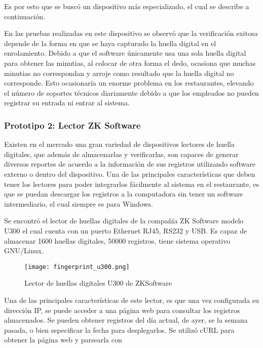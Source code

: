 Es por esto que se buscó un dispositivo más especializado, el cual se describe a continuación.

En las pruebas realizadas en este dispositivo se observó que la verificación exitosa depende de la forma en que se haya capturado la huella digital en el enrolamiento. Debido a que el software únicamente usa una sola huella digital para obtener las minutias, al colocar de otra forma el dedo, ocasiona que muchas minutias no correspondan y arroje como resultado que la huella digital no corresponde. Esto ocasionaría un enorme problema en los restaurantes, elevando el número de soportes técnicos diariamente debido a que los empleados no pueden registrar su entrada ni entrar al sistema.

\subsubsection{Prototipo 2: Lector ZK Software}
\label{sec:lector_zksoftware}

Existen en el mercado una gran variedad de dispositivos lectores de huella digitales, que además de almacenarlas y verificarlas, son capaces de generar diversos reportes de acuerdo a la información de sus registros utilizando software externo o dentro del dispositivo. Una de las principales características que deben tener los lectores para poder integrarlos fácilmente al sistema en el restaurante, es que se puedan descargar los registros a la computadora sin tener un software intermediario, el cual siempre es para Windows. 

Se encontró el lector de huellas digitales de la compañía ZK Software modelo U300 el cual cuenta con un puerto Ethernet RJ45, RS232 y USB. Es capaz de almacenar 1600 huellas digitales, 50000 registros, tiene sistema operativo GNU/Linux.

\begin{figure}[htb]
 \begin{center}
  \texttt{[image: fingerprint\_u300.png]}
 \end{center}
 \caption{Lector de huellas digitales U300 de ZKSoftware}
 \label{fig:finger_print_7}
\end{figure}

Una de las principales características de este lector, es que una vez configurada su dirección IP, se puede acceder a una página web para consultar los registros almacenados. Se pueden obtener registros del día actual, de ayer, se la semana pasada, o bien especificar la fecha para desplegarlos. Se utilizó cURL para obtener la página web y parsearla con